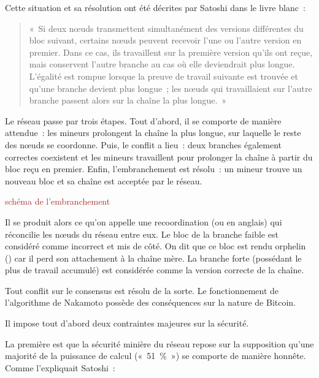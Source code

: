 Cette situation et sa résolution ont été décrites par Satoshi dans le livre blanc~:

\begin{quote}
«~Si deux nœuds transmettent simultanément des versions différentes du bloc suivant, certains nœuds peuvent recevoir l'une ou l'autre version en premier. Dans ce cas, ils travaillent sur la première version qu'ils ont reçue, mais conservent l'autre branche au cas où elle deviendrait plus longue. L'égalité est rompue lorsque la preuve de travail suivante est trouvée et qu'une branche devient plus longue~; les nœuds qui travaillaient sur l'autre branche passent alors sur la chaîne la plus longue.~»
\end{quote}

Le réseau passe par trois étapes. Tout d'abord, il se comporte de manière attendue~: les mineurs prolongent la chaîne la plus longue, sur laquelle le reste des nœuds se coordonne. Puis, le conflit a lieu~: deux branches également correctes coexistent et les mineurs travaillent pour prolonger la chaîne à partir du bloc reçu en premier. Enfin, l'embranchement est résolu~: un mineur trouve un nouveau bloc et sa chaîne est acceptée par le réseau.

\textcolor{brown}{schéma de l'embranchement} 

Il se produit alors ce qu'on appelle une recoordination (ou  en anglais) qui réconcilie les nœuds du réseau entre eux. Le bloc de la branche faible est considéré comme incorrect et mis de côté. On dit que ce bloc est rendu orphelin () car il perd son attachement à la chaîne mère. La branche forte (possédant le plus de travail accumulé) est considérée comme la version correcte de la chaîne.

Tout conflit sur le consensus est résolu de la sorte. Le fonctionnement de l'algorithme de Nakamoto possède des conséquences sur la nature de Bitcoin.


Il impose tout d'abord deux contraintes majeures sur la sécurité.

La première est que la sécurité minière du réseau repose sur la supposition qu'une majorité de la puissance de calcul («~51~\%~») se comporte de manière honnête. Comme l'expliquait Satoshi~:

